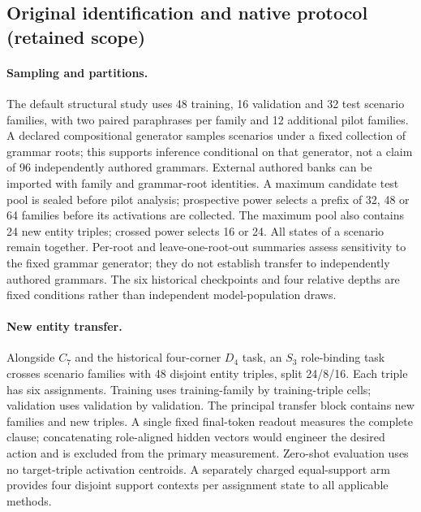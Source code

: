 \subsection{Original identification and native protocol (retained scope)}

\paragraph{Sampling and partitions.}
The default structural study uses 48 training, 16 validation and 32 test scenario families, with two paired paraphrases per family and 12 additional pilot families. A declared compositional generator samples scenarios under a fixed collection of grammar roots; this supports inference conditional on that generator, not a claim of 96 independently authored grammars. External authored banks can be imported with family and grammar-root identities. A maximum candidate test pool is sealed before pilot analysis; prospective power selects a prefix of 32, 48 or 64 families before its activations are collected. The maximum pool also contains 24 new entity triples; crossed power selects 16 or 24. All states of a scenario remain together. Per-root and leave-one-root-out summaries assess sensitivity to the fixed grammar generator; they do not establish transfer to independently authored grammars. The six historical checkpoints and four relative depths are fixed conditions rather than independent model-population draws.

\paragraph{New entity transfer.}
Alongside $C_7$ and the historical four-corner $D_4$ task, an $S_3$ role-binding task crosses scenario families with 48 disjoint entity triples, split 24/8/16. Each triple has six assignments. Training uses training-family by training-triple cells; validation uses validation by validation. The principal transfer block contains new families and new triples. A single fixed final-token readout measures the complete clause; concatenating role-aligned hidden vectors would engineer the desired action and is excluded from the primary measurement. Zero-shot evaluation uses no target-triple activation centroids. A separately charged equal-support arm provides four disjoint support contexts per assignment state to all applicable methods.

